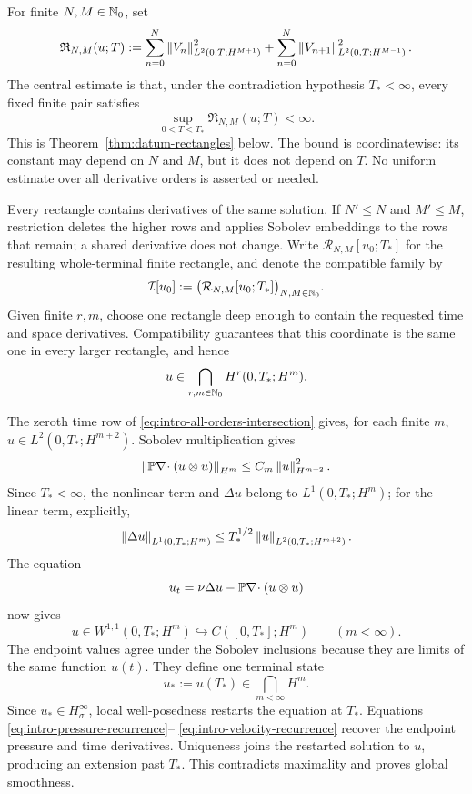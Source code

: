 For finite \(N,M\in\mathbb N_0\), set
\begin{equation}
 \mathfrak R_{N,M}(u;T)
 :=\sum_{n=0}^{N}\left\lVert V_n\right\rVert_{L^2(0,T;H^{M+1})}^2
 +\sum_{n=0}^{N}\left\lVert V_{n+1}\right\rVert_{L^2(0,T;H^{M-1})}^2.
 \label{eq:intro-rectangle-norm}
\end{equation}
The central estimate is that, under the contradiction hypothesis
\(T_*<\infty\), every fixed finite pair satisfies
\begin{equation}
 \sup_{0<T<T_*}\mathfrak R_{N,M}(u;T)<\infty.
 \label{eq:intro-terminal-rectangle}
\end{equation}
This is Theorem~\ref{thm:datum-rectangles} below.
The bound is coordinatewise: its constant may depend on \(N\) and \(M\), but
it does not depend on \(T\).  No uniform estimate over all derivative orders
is asserted or needed.

Every rectangle contains derivatives of the same solution.  If
\(N'\le N\) and \(M'\le M\), restriction deletes the higher rows and applies
Sobolev embeddings to the rows that remain; a shared derivative does not
change.  Write \(\mathcal R_{N,M}[u_0;T_*]\) for the resulting whole-terminal
finite rectangle, and denote the compatible family by
\begin{equation}
 \mathcal I[u_0]
 :=\bigl(\mathcal R_{N,M}[u_0;T_*]\bigr)_{N,M\in\mathbb N_0}.
 \label{eq:intro-compatible-intersection}
\end{equation}
Given finite \(r,m\), choose one rectangle deep enough to contain the
requested time and space derivatives.  Compatibility guarantees that this
coordinate is the same one in every larger rectangle, and hence
\begin{equation}
 u\in\bigcap_{r,m\in\mathbb N_0}H^r(0,T_*;H^m).
 \label{eq:intro-all-orders-intersection}
\end{equation}

The zeroth time row of \eqref{eq:intro-all-orders-intersection} gives, for
each finite \(m\), \(u\in L^2(0,T_*;H^{m+2})\).  Sobolev multiplication gives
\[
 \left\lVert \mathbb P\nabla\!\cdot(u\otimes u)\right\rVert_{H^m}
 \le C_m\left\lVert u\right\rVert_{H^{m+2}}^2.
\]
Since \(T_*<\infty\), the nonlinear term and \(\Delta u\) belong to
\(L^1(0,T_*;H^m)\); for the linear term, explicitly,
\[
 \left\lVert \Delta u\right\rVert_{L^1(0,T_*;H^m)}
 \le T_*^{1/2}\left\lVert u\right\rVert_{L^2(0,T_*;H^{m+2})}.
\]
The equation
\[
 u_t=\nu\Delta u-\mathbb P\nabla\!\cdot(u\otimes u)
\]
now gives
\[
 u\in W^{1,1}(0,T_*;H^m)
 \hookrightarrow C([0,T_*];H^m)
 \qquad(m<\infty).
\]
The endpoint values agree under the Sobolev inclusions because they are limits
of the same function \(u(t)\).  They define one terminal state
\[
 u_*:=u(T_*)\in\bigcap_{m<\infty}H^m.
\]
Since \(u_*\in H^\infty_\sigma\), local well-posedness restarts the equation
at \(T_*\).  Equations \eqref{eq:intro-pressure-recurrence}--
\eqref{eq:intro-velocity-recurrence} recover the endpoint pressure and time
derivatives.  Uniqueness joins the restarted solution to \(u\), producing an
extension past \(T_*\).  This contradicts maximality and proves global
smoothness.

\clearpage
